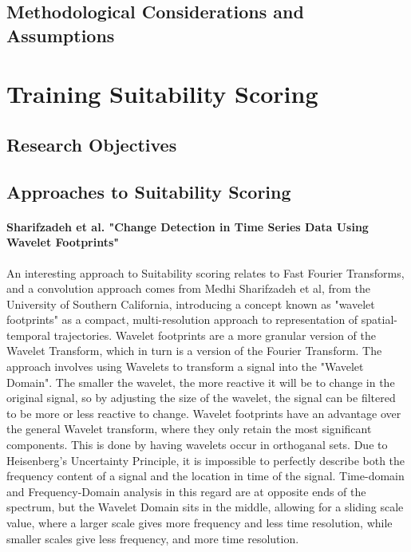 \documentclass[11pt,twoside]{report}
\begin{document}
\subsection{Methodological Considerations and Assumptions}

\section{Training Suitability Scoring}

\subsection{Research Objectives}
\subsection{Approaches to Suitability Scoring}
\paragraph{Sharifzadeh et al. "Change Detection in Time Series Data Using Wavelet \citep{Sharifzadeh2005} Footprints"}
An interesting approach to Suitability scoring relates to Fast Fourier Transforms, and a convolution approach comes from Medhi Sharifzadeh et al, from the University of Southern California, introducing a concept known as
"wavelet footprints" as a compact, multi-resolution approach to representation of spatial-temporal trajectories. Wavelet footprints are a  more granular version of the Wavelet Transform, which in turn is a version of the Fourier Transform. The approach involves using Wavelets to transform a signal into the "Wavelet Domain".
The smaller the wavelet, the more reactive it will be to change in the original signal, so by adjusting the size of the wavelet, the signal can be filtered to be more or less reactive to change.
Wavelet footprints have an advantage over the general Wavelet transform, where they only retain the most significant components. This is done by having wavelets occur in orthoganal sets.
Due to Heisenberg's Uncertainty Principle, it is impossible to perfectly describe both the frequency content of a signal and the location in time of the signal. Time-domain and Frequency-Domain analysis in this regard are
at opposite ends of the spectrum, but the Wavelet Domain sits in the middle, allowing for a sliding scale value, where a larger scale gives more frequency and less time resolution, while smaller scales give less frequency, and more time resolution.
\end{document}
